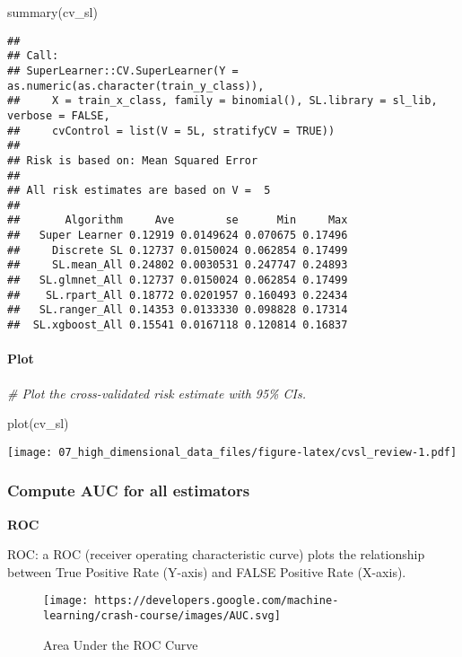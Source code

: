 \documentclass[
]{book}
\newenvironment{Shaded}{\begin{snugshade}}{\end{snugshade}}
\newcommand{\CommentTok}[1]{\textcolor[rgb]{0.56,0.35,0.01}{\textit{#1}}}
\newcommand{\FunctionTok}[1]{\textcolor[rgb]{0.00,0.00,0.00}{#1}}
\newcommand{\NormalTok}[1]{#1}
\begin{document}
\begin{Shaded}
\begin{Highlighting}[]
\FunctionTok{summary}\NormalTok{(cv\_sl)}
\end{Highlighting}
\end{Shaded}

\begin{verbatim}
## 
## Call:  
## SuperLearner::CV.SuperLearner(Y = as.numeric(as.character(train_y_class)),  
##     X = train_x_class, family = binomial(), SL.library = sl_lib, verbose = FALSE,  
##     cvControl = list(V = 5L, stratifyCV = TRUE)) 
## 
## Risk is based on: Mean Squared Error
## 
## All risk estimates are based on V =  5 
## 
##       Algorithm     Ave        se      Min     Max
##   Super Learner 0.12919 0.0149624 0.070675 0.17496
##     Discrete SL 0.12737 0.0150024 0.062854 0.17499
##     SL.mean_All 0.24802 0.0030531 0.247747 0.24893
##   SL.glmnet_All 0.12737 0.0150024 0.062854 0.17499
##    SL.rpart_All 0.18772 0.0201957 0.160493 0.22434
##   SL.ranger_All 0.14353 0.0133330 0.098828 0.17314
##  SL.xgboost_All 0.15541 0.0167118 0.120814 0.16837
\end{verbatim}

\hypertarget{plot}{%
\paragraph{Plot}\label{plot}}

\begin{Shaded}
\begin{Highlighting}[]
\CommentTok{\# Plot the cross{-}validated risk estimate with 95\% CIs.}

\FunctionTok{plot}\NormalTok{(cv\_sl)}
\end{Highlighting}
\end{Shaded}

\texttt{[image: 07\_high\_dimensional\_data\_files/figure-latex/cvsl\_review-1.pdf]}

\hypertarget{compute-auc-for-all-estimators}{%
\subsubsection{Compute AUC for all estimators}\label{compute-auc-for-all-estimators}}

\textbf{ROC}

ROC: a ROC (receiver operating characteristic curve) plots the relationship between True Positive Rate (Y-axis) and FALSE Positive Rate (X-axis).

\begin{figure}
\centering
\texttt{[image: https://developers.google.com/machine-learning/crash-course/images/AUC.svg]}
\caption{Area Under the ROC Curve}
\end{figure}
\end{document}
